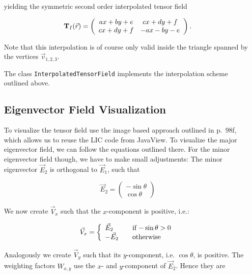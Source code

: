 \documentclass[a4paper,10pt,notitlepage]{scrartcl}
\newcommand{\mat}[1]{\mathbf{#1}}
\begin{document}
yielding the symmetric second order interpolated tensor field

\begin{equation}
 \mat{T}_I(\vec{r}) = \left(\begin{array}{c c}
                       ax + by + e & cx + dy + f \\
                       cx + dy + f & -ax -by -e
                      \end{array}\right).
 \label{eq:tf-linear}
\end{equation}

Note that this interpolation is of course only valid inside the triangle
spanned by the vertices $\vec{v}_{1,2,3}$.

The class \texttt{InterpolatedTensorField} implements the interpolation scheme
outlined above.

\subsection{Eigenvector Field Visualization}

To visualize the tensor field use the image based approach outlined in
\cite{tfd} p.~98f, which allows us to reuse the LIC code from JavaView. To
visualize the major eigenvector field, we can follow the equations outlined
there. For the minor eigenvector field though, we have to make small
adjustments: The minor eigenvector $\vec{E}_2$ is orthogonal to $\vec{E}_1$,
such that

\begin{equation}
 \vec{E}_2 = \left( \begin{array}{c}
              -\sin \theta \\
              \cos \theta
             \end{array} \right)
\end{equation}

We now create $\vec{V}_x$ such that the $x$-component is positive, i.e.:

\begin{equation}
 \vec{V}_x = \left \{  \begin{array}{l l}
                       \vec{E}_2 & \quad \text{if $-\sin \theta > 0$} \\
                       -\vec{E}_2 & \quad \text{otherwise}
                       \end{array} \right.
\end{equation}

Analogously we create $\vec{V}_y$ such that its $y$-component, i.e. $\cos
\theta$, is positive. The weighting factors $W_{x,y}$ use the $x$- and
$y$-component of $\vec{E}_2$. Hence they are
\end{document}
